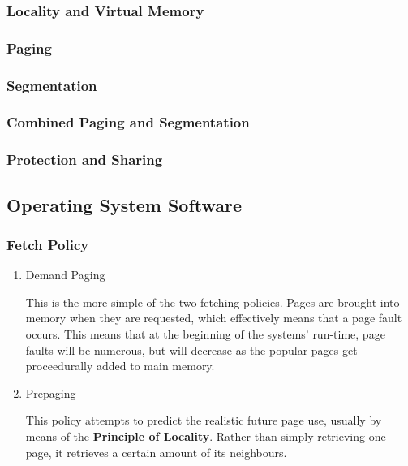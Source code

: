 \documentclass[11pt]{article}
\begin{document}
\subsubsection{Locality and Virtual Memory}
\label{sec-2-1-1}

\subsubsection{Paging}
\label{sec-2-1-2}

\subsubsection{Segmentation}
\label{sec-2-1-3}

\subsubsection{Combined Paging and Segmentation}
\label{sec-2-1-4}

\subsubsection{Protection and Sharing}
\label{sec-2-1-5}

\subsection{Operating System Software}
\label{sec-2-2}

\subsubsection{Fetch Policy}
\label{sec-2-2-1}

\begin{enumerate}
\item Demand Paging
\label{sec-2-2-1-1}

This is the more simple of the two fetching policies.
Pages are brought into memory when they are requested,
which effectively means that a page fault occurs. This
means that at the beginning of the systems' run-time,
page faults will be numerous, but will decrease as the
popular pages get proceedurally added to main memory.

\item Prepaging
\label{sec-2-2-1-2}

This policy attempts to predict the realistic future page
use, usually by means of the \textbf{Principle of Locality}. Rather
than simply retrieving one page, it retrieves a certain
amount of its neighbours.
\end{enumerate}
\end{document}
